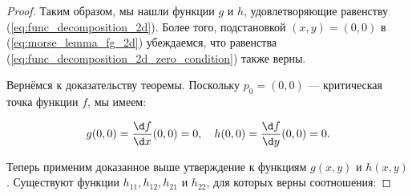 \documentclass[a4paper,12pt,openany,leqno]{extbook}
\begin{document}
\begin{proof}
Таким образом, мы нашли функции $g$ и $h$, удовлетворяющие равенству (\ref{eq:func_decomposition_2d}). Более того, подстановкой $(x, y) = (0, 0)$ в (\ref{eq:morse_lemma_fg_2d}) убеждаемся, что равенства (\ref{eq:func_decomposition_2d_zero_condition}) также верны.

Вернёмся к доказательству теоремы. Поскольку $p_0 = (0, 0)$ --- критическая точка функции $f$, мы имеем:

\begin{equation}
g(0, 0) = \dfrac{\d f}{\d x}(0, 0) = 0,\quad h(0, 0) = \dfrac{\d f}{\d y}(0, 0) = 0.
\end{equation}

Теперь применим доказанное выше утверждение к функциям $g(x, y)$ и $h(x, y)$. Существуют функции $h_{11}, h_{12}, h_{21}$ и $h_{22}$, для которых верны соотношения:


\end{proof}
\end{document}
